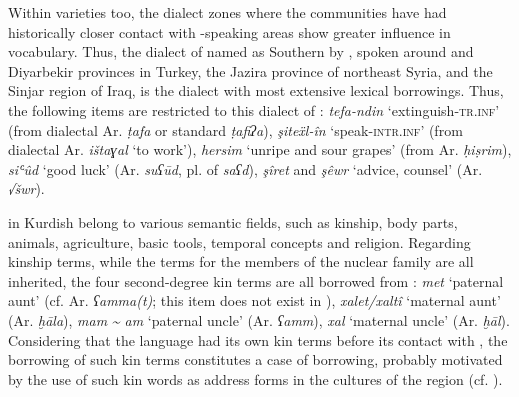\documentclass[output=paper]{langsci/langscibook}
\begin{document}
Within varieties too, the dialect zones where the communities have had historically closer contact with -speaking areas show greater  influence in vocabulary. Thus, the dialect of  named as Southern  by  \citet{ÖpenginHaig2014}, spoken around  and Diyarbekir provinces in Turkey, the Jazira province of northeast Syria, and the Sinjar region of Iraq, is the dialect with most extensive  lexical borrowings. Thus, the following items are restricted to this dialect of : \textit{tefa-ndin} ‘extinguish-\textsc{tr.inf}’ (from dialectal Ar. \textit{ṭafa} or standard \textit{ṭafiʔa}), \textit{şiteẍl-în} ‘speak-\textsc{intr.inf}’ (from dialectal Ar. \textit{ištaɣal} ‘to work’), \textit{hersim} ‘unripe and sour grapes’ (from Ar. \textit{ḥiṣrim}), \textit{siʿûd} ‘good luck’ (Ar. \textit{suʕūd}, pl. of \textit{saʕd}), \textit{şîret} and \textit{şêwr} ‘advice, counsel’ (Ar. \textit{√šwr}).     

  in Kurdish belong to various semantic fields, such as kinship, body parts, animals, agriculture, basic tools, temporal concepts and religion. Regarding kinship terms, while the terms for the members of the nuclear family are all inherited, the four second-degree kin terms are all borrowed from : \textit{met} ‘paternal aunt’ (cf. Ar. \textit{ʕamma(t)}; this item does not exist in ), \textit{xalet/xaltî} ‘maternal aunt’ (Ar. \textit{ḫāla}), \textit{mam} \textit{{\textasciitilde} am} ‘paternal uncle’ (Ar. \textit{ʕamm}), \textit{xal} ‘maternal uncle’ (Ar. \textit{ḫāl}). Considering that the language had its own kin terms before its contact with , the borrowing of such kin terms constitutes a case of  borrowing, probably motivated by the use of such kin words as address forms in the cultures of the region (cf. \citealt{HaigÖpengin2015}).
\end{document}
